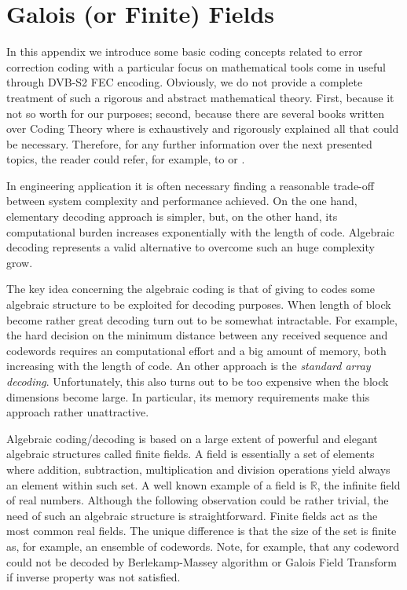 
\chapter{Galois (or Finite) Fields}

In this appendix we introduce some basic coding concepts related to error correction coding with a particular focus on mathematical tools come in useful through DVB-S2 FEC encoding. Obviously, we do not provide a complete treatment of such a rigorous and abstract mathematical theory. First, because it not so worth for our purposes; second, because there are several books written over Coding Theory where is exhaustively and rigorously explained all that could be necessary. Therefore, for any further information over the next presented topics, the reader could refer, for example, to \cite{b:moon} or \cite{b:mcwilliams}.

In engineering application it is often necessary finding a reasonable trade-off between system complexity and performance achieved. On the one hand, elementary decoding approach is simpler, but, on the other hand, its computational burden increases exponentially with the length of code. Algebraic decoding represents a valid alternative to overcome such an huge complexity grow.

The key idea concerning the algebraic coding is that of giving to codes some algebraic structure to be exploited for decoding purposes. When length of block become rather great decoding turn out to be somewhat intractable. For example, the hard decision on the minimum distance between any received sequence and codewords requires an computational effort and a big amount of memory, both increasing with the length of code. An other approach is the \emph{standard array decoding}. Unfortunately, this also turns out to be too expensive when the block dimensions become large. In particular, its memory requirements make this approach rather unattractive.

Algebraic coding/decoding is based on a large extent of powerful and elegant algebraic structures called finite fields.
A field is essentially a set of elements where addition, subtraction, multiplication and division operations yield always an element within such set. A well known example of a field is \(\mathbb R\), the infinite field of real numbers. Although the following observation could be rather trivial, the need of such an algebraic structure is straightforward. Finite fields act as the most common real fields. The unique difference is that the size of the set is finite as, for example, an ensemble of codewords. Note, for example, that any codeword could not be decoded by Berlekamp-Massey algorithm or Galois Field Transform if inverse property was not satisfied.

